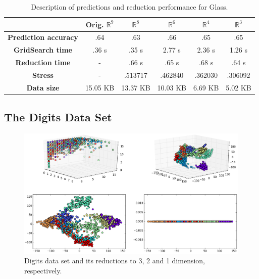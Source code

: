 \documentclass[12pt]{report}
\begin{document}
\begin{table}[H]
	\centering
	\begin{tabular}{|c|c|c|c|c|c|}
		\hline
		& \textbf{Orig. $\mathbb{R}^{9}$} & \textbf{$\mathbb{R}^8$} & \textbf{$\mathbb{R}^6$} & \textbf{$\mathbb{R}^4$}  & \textbf{$\mathbb{R}^3$} \\\hline
		\textbf{Prediction accuracy}   & .64 & .63  & .66 & .65  & .65 \\\hline
		\textbf{GridSearch time} & .36 s & .35 s   & 2.77 s & 2.36 s & 1.26 s  \\\hline
		\textbf{Reduction time}  & -  & .66 s & .65 s & .68 s    & .64 s     \\\hline
		\textbf{Stress} & - & .513717 & .462840 & .362030 & .306092 \\\hline
		\textbf{Data size}          & 15.05 KB & 13.37 KB & 10.03 KB & 6.69 KB & 5.02 KB   \\\hline
	\end{tabular}

	\caption{Description of predictions and reduction performance for Glass.}
\end{table}

\newpage
\subsection{The Digits Data Set}

\begin{figure}[H]
	\centering
	\includegraphics[width=\linewidth]{experiments/iso_digits}
	\captionsetup{justification=centering}
	\caption{Digits data set and its reductions to 3, 2 and 1 dimension, respectively.}
	\label{fig:dsdigitsiso}
\end{figure}
\end{document}
